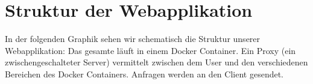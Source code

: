 \section{Struktur der Webapplikation}

In der folgenden Graphik sehen wir schematisch die Struktur unserer Webapplikation: Das gesamte läuft in einem Docker Container. Ein Proxy (ein zwischengeschalteter Server) vermittelt zwischen dem User und den verschiedenen Bereichen des Docker Containers. Anfragen werden an den Client gesendet.








